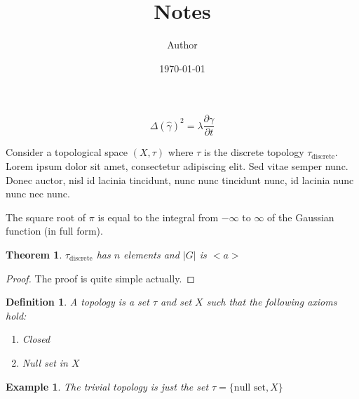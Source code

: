 \documentclass[12pt]{article}
\title{Notes}
\author{Author}
\date{\today}
\newtheorem{theorem}{Theorem}
\newtheorem{definition}{Definition}
\newtheorem{example}{Example}
\begin{document}
\maketitle

\[\Delta (\hat{\gamma})^2 = \lambda \frac{\partial \gamma}{\partial t}\]

Consider a topological space \((X, \tau)\) where \(\tau\) is the discrete topology \(\tau_{\text{discrete}}\). Lorem ipsum dolor sit amet, consectetur adipiscing elit. Sed vitae semper nunc. Donec auctor, nisl id lacinia tincidunt, nunc nunc tincidunt nunc, id lacinia nunc nunc nec nunc. 

The square root of \(\pi\) is equal to the integral from \(-\infty\) to \(\infty\) of the Gaussian function (in full form).

\begin{theorem}
\(\tau_{\text{discrete}}\) has \(n\) elements and \(|G|\) is \(<a>\)
\end{theorem}

\begin{proof}
The proof is quite simple actually.
\end{proof}

\begin{definition}
A topology is a set \(\tau\) and set \(X\) such that the following axioms hold:
\begin{enumerate}
\item[\textbf{O1:}] Closed
\item[\textbf{O2:}] Null set in \(X\)
\end{enumerate}
\end{definition}

\begin{example}
The trivial topology is just the set \(\tau = \{\text{null set}, X\}\)
\end{example}
\end{document}
